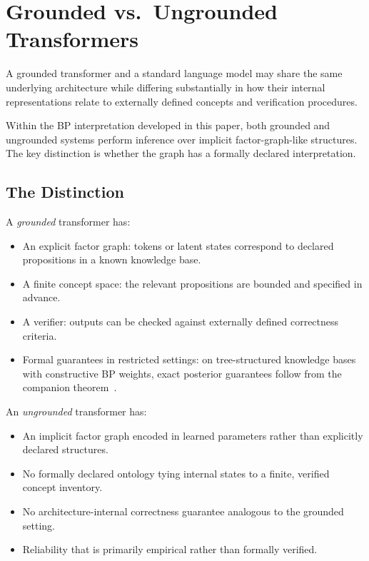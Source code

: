\section{Grounded vs.\ Ungrounded Transformers}
\label{sec:grounded-ungrounded}

A grounded transformer and a standard language model may share the same
underlying architecture while differing substantially in how their
internal representations relate to externally defined concepts and
verification procedures.

Within the BP interpretation developed in this paper, both grounded and
ungrounded systems perform inference over implicit factor-graph-like
structures. The key distinction is whether the graph has a formally
declared interpretation.

\subsection*{The Distinction}

A \emph{grounded} transformer has:

\begin{itemize}
\item An explicit factor graph: tokens or latent states correspond to
declared propositions in a known knowledge base.

\item A finite concept space: the relevant propositions are bounded and
specified in advance.

\item A verifier: outputs can be checked against externally defined
correctness criteria.

\item Formal guarantees in restricted settings: on tree-structured
knowledge bases with constructive BP weights, exact posterior guarantees
follow from the companion theorem~\cite{coppola2026transformers}.
\end{itemize}

An \emph{ungrounded} transformer has:

\begin{itemize}
\item An implicit factor graph encoded in learned parameters rather than
explicitly declared structures.

\item No formally declared ontology tying internal states to a finite,
verified concept inventory.

\item No architecture-internal correctness guarantee analogous to the
grounded setting.

\item Reliability that is primarily empirical rather than formally
verified.
\end{itemize}

